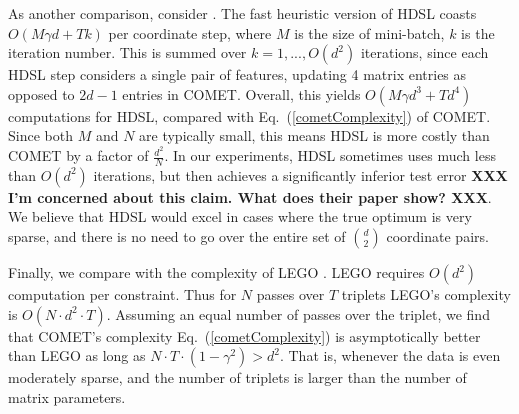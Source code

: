 \documentclass[twoside,11pt]{article}
\renewcommand{\eqref}[1]{Eq.~(\ref{#1})}
\begin{document}

As another comparison, consider \citet{HDSL}. The fast heuristic version of HDSL coasts $O(M\gamma d+Tk)$ per coordinate step, where $M$ is the size of mini-batch, $k$ is the iteration number. This is summed over $k=1,...,O(d^2)$ iterations, since each HDSL step considers a single pair of features, updating 4 matrix entries as opposed to $2d-1$ entries in COMET. Overall, this yields $O(M\gamma d^3+Td^4)$ computations for HDSL, compared with \eqref{cometComplexity} of COMET. Since both $M$ and $N$ are typically small, this means HDSL is more costly than COMET by a factor of $\frac{d^2}{N}$. In our experiments, HDSL sometimes uses much less than $O(d^2)$ iterations, but then achieves a significantly inferior test error {\bf XXX I'm concerned about this claim. What does their paper show? XXX}. We believe that HDSL would excel in cases where the true optimum is very sparse, and there is no need to go over the entire set of $d \choose 2$ coordinate pairs.

Finally, we compare with the complexity of LEGO \citep{lego}. LEGO requires $O(d^2)$ computation per constraint. Thus for $N$ passes over $T$ triplets LEGO's complexity is $O(N\cdot d^2 \cdot T)$. Assuming an equal number of passes over the triplet, we find that COMET's complexity \eqref{cometComplexity} is asymptotically better than LEGO as long as $N \cdot T \cdot (1-\gamma^2) > d^2$. That is, whenever the data is even moderately sparse, and the number of triplets is larger than the number of matrix parameters.
\end{document}
